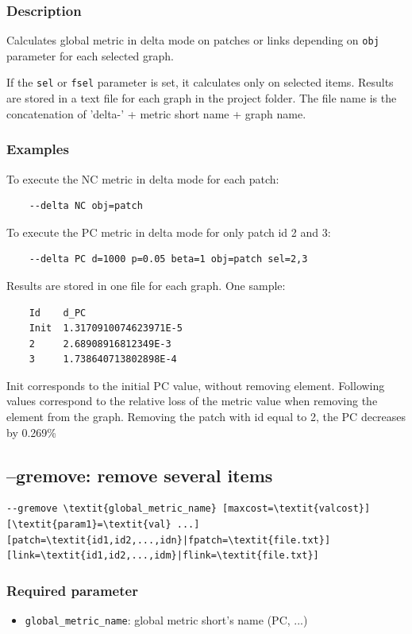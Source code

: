 \documentclass[a4paper,10pt]{report}
\begin{document}
\subsubsection{Description}
Calculates global metric in delta mode on patches or links depending on \verb|obj| parameter for each selected graph. 

If the \verb|sel| or \verb|fsel| parameter is set, it calculates only on selected items.
Results are stored in a text file for each graph in the project folder. The file name is the concatenation of 'delta-' + metric short name + graph name. 


\subsubsection{Examples}
To execute the NC metric in delta mode for each patch:
\begin{Verbatim}
	--delta NC obj=patch
\end{Verbatim}

To execute the PC metric in delta mode for only patch id 2 and 3:
\begin{Verbatim}
	--delta PC d=1000 p=0.05 beta=1 obj=patch sel=2,3
\end{Verbatim}
Results are stored in one file for each graph. One sample:
\begin{Verbatim}
	Id    d_PC
	Init  1.3170910074623971E-5
	2     2.68908916812349E-3
	3     1.738640713802898E-4
\end{Verbatim}
Init corresponds to the initial PC value, without removing element. Following values correspond to the relative loss of the metric value when removing the element from the graph.
Removing the patch with id equal to 2, the PC decreases by 0.269\%


\subsection{--gremove: remove several items}
\begin{Verbatim}[commandchars=\\\{\}]
--gremove \textit{global_metric_name} [maxcost=\textit{valcost}] [\textit{param1}=\textit{val} ...]
[patch=\textit{id1,id2,...,idn}|fpatch=\textit{file.txt}] [link=\textit{id1,id2,...,idm}|flink=\textit{file.txt}]
\end{Verbatim}

\subsubsection{Required parameter}
\begin{itemize}
	\item \verb|global_metric_name|: global metric short's name (PC, ...)
\end{itemize}
\end{document}
